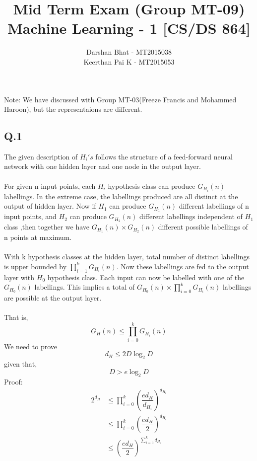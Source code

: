 \documentclass[17pt]{article}
\begin{document}
\title{ Mid Term Exam (Group MT-09)\\Machine Learning - 1 [CS/DS 864] }
\author{Darshan Bhat - MT2015038\\Keerthan Pai K - MT2015053}
\maketitle
Note: We have discussed with Group MT-03(Freeze Francis and Mohammed Haroon), but the representaions are different.
\\
\subsection*{Q.1}
The given description of $H_i's$ follows the structure of a feed-forward neural network with one hidden layer and one node in the output layer.\\\\
For given n input points, each $H_i$ hypothesis class can produce $G_{H_{i}}(n)$ labellings. In the extreme case, the labellings produced are all distinct at the output of hidden layer. Now if $H_1$ can produce $G_{H_{1}}(n)$ different labellings of n input points, and $H_2$ can produce $G_{H_{2}}(n)$ different labellings independent of $H_1$ class ,then together we have $G_{H_{1}}(n) \times G_{H_{2}}(n)$ different possible labellings of n points at maximum.\\\\
With k hypothesis classes at the hidden layer, total number of distinct labellings is upper bounded by $\prod_{i=1}^{k}G_{H_{i}}(n)$. Now these labellings are fed to the output layer with $H_0$ hypothesis class. Each input can now be labelled with one of the $G_{H_{0}}(n)$ labellings. This implies a total of 
$G_{H_{0}}(n) \times \prod_{i=0}^{k}G_{H_{i}}(n)$ labellings are possible at the output layer.\\\\
That is,
$$G_{H}(n) \leq \prod_{i=0}^{k}G_{H_{i}}(n)$$
We need to prove
$$d_{H} \leq 2D\log_{2}D$$
given that,
$$D > e\log_{2}D$$
Proof:
\begin{equation*}
\begin{aligned}
2^{d_{H}} & \leq \prod_{i=0}^{k} \left( \dfrac{e d_{H}}{d_{H_{i}}}\right)^{d_{H_{i}}}\\
&  \leq \prod_{i=0}^{k} \left( \dfrac{e d_{H}}{2}\right)^{d_{H_{i}}}\\
&  \leq  \left( \dfrac{e d_{H}}{2}\right)^{ \sum_{i=0}^{k} d_{H_{i}}}\\
\end{aligned}
\end{equation*}
\end{document}
